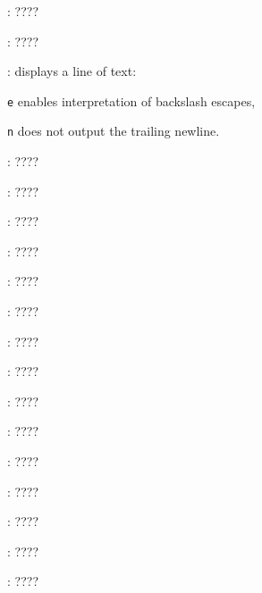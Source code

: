 \begin{compactenum}
\item [\symbolbash] : \dotfill ????

\item [\symbolbash] : \dotfill ????

\item [\symbolbash] : displays a line of text:
\item [\texttt{e}] enables interpretation of backslash escapes,
\item [\texttt{n}] does not output the trailing newline.

\item [\symbolbash] : \dotfill ????

\item [\symbolbash] : \dotfill ????

\item [\symbolbash] : \dotfill ????

\item [\symbolbash] : \dotfill ????

\item [\symbolbash] : \dotfill ????

\item [\symbolbash] : \dotfill ????

\item [\symbolbash] : \dotfill ????

\item [\symbolbash] : \dotfill ????

\item [\symbolbash] : \dotfill ????

\item [\symbolbash] : \dotfill ????

\item [\symbolbash] : \dotfill ????

\item [\symbolbash] : \dotfill ????

\item [\symbolbash] : \dotfill ????

\item [\symbolbash] : \dotfill ????

\item [\symbolbash] : \dotfill ????


\end{compactenum}
